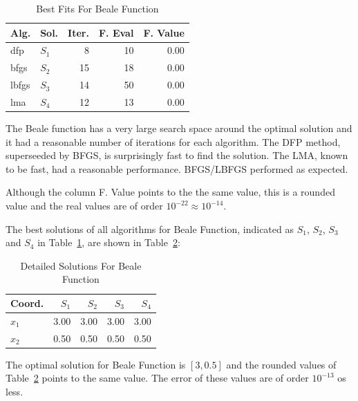 \documentclass[conference]{IEEEtran}
\begin{document}
\begin{table}[H]
\centering
\caption{Best Fits For Beale Function}
\label{solutions:beale}
\begin{tabular}{llrrr}
\toprule
 Alg. &    Sol. &  Iter. &  F. Eval &  F. Value \\
\midrule
  dfp & $S_{1}$ &      8 &       10 &      0.00 \\
 bfgs & $S_{2}$ &     15 &       18 &      0.00 \\
lbfgs & $S_{3}$ &     14 &       50 &      0.00 \\
  lma & $S_{4}$ &     12 &       13 &      0.00 \\
\bottomrule
\end{tabular}
\end{table}

The Beale function has a very large search space around the optimal solution and
it had a reasonable number of iterations for each algorithm. The DFP method, superseeded by BFGS,
is surprisingly fast to find the solution. The LMA, known to be fast, had a reasonable performance.
BFGS/LBFGS performed as expected.

Although the column F. Value points to the the same value, this is a rounded value
and the real values are of order $10^{-22} \approx 10^{-14}$.



The best solutions of all algorithms for Beale Function, indicated as
$S_{1}$, $S_{2}$, $S_{3}$ and $S_{4}$ in Table~\ref{solutions:beale}, are shown
in Table~\ref{detailedsolutions:beale}:

\begin{table}[H]
\centering
\caption{Detailed Solutions For Beale Function}
\label{detailedsolutions:beale}
\begin{tabular}{lrrrr}
\toprule
 Coord. &  $S_{1}$ &  $S_{2}$ &  $S_{3}$ &  $S_{4}$ \\
\midrule
$x_{1}$ &     3.00 &     3.00 &     3.00 &     3.00 \\
$x_{2}$ &     0.50 &     0.50 &     0.50 &     0.50 \\
\bottomrule
\end{tabular}
\end{table}

The optimal solution for Beale Function is $\left[3, 0.5\right]$ and the rounded values
of Table~\ref{detailedsolutions:beale} points to the same value. The error of
these values are of order $10^{-13}$ os less.
\end{document}
